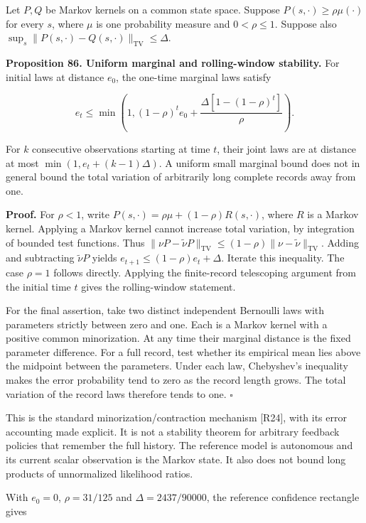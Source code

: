 Let \(P,Q\) be Markov kernels on a common state space. Suppose
\(P(s,\cdot)\geq\rho\mu(\cdot)\) for every \(s\), where \(\mu\) is one
probability measure and \(0<\rho\leq1\). Suppose also
\(\sup_s\|P(s,\cdot)-Q(s,\cdot)\|_{\mathrm{TV}}\leq\Delta\).

\textbf{Proposition 86. Uniform marginal and rolling-window stability.}
For initial laws at distance \(e_0\), the one-time marginal laws satisfy

\[
\boxed{
e_t\leq\min\left(1,
(1-\rho)^te_0+
\frac{\Delta[1-(1-\rho)^t]}{\rho}\right).
}
\]

For \(k\) consecutive observations starting at time \(t\), their joint
laws are at distance at most \(\min(1,e_t+(k-1)\Delta)\). A uniform
small marginal bound does not in general bound the total variation of
arbitrarily long complete records away from one.

\textbf{Proof.} For \(\rho<1\), write
\(P(s,\cdot)=\rho\mu+(1-\rho)R(s,\cdot)\), where \(R\) is a Markov
kernel. Applying a Markov kernel cannot increase total variation, by
integration of bounded test functions. Thus
\(\|\nu P-\widetilde\nu P\|_{\mathrm{TV}}\leq(1-\rho)\|\nu-\widetilde\nu\|_{\mathrm{TV}}\).
Adding and subtracting \(\widetilde\nu P\) yields
\(e_{t+1}\leq(1-\rho)e_t+\Delta\). Iterate this inequality. The case
\(\rho=1\) follows directly. Applying the finite-record telescoping
argument from the initial time \(t\) gives the rolling-window statement.

For the final assertion, take two distinct independent Bernoulli laws
with parameters strictly between zero and one. Each is a Markov kernel
with a positive common minorization. At any time their marginal distance
is the fixed parameter difference. For a full record, test whether its
empirical mean lies above the midpoint between the parameters. Under
each law, Chebyshev's inequality makes the error probability tend to
zero as the record length grows. The total variation of the record laws
therefore tends to one. \(\square\)

This is the standard minorization/contraction mechanism {[}R24{]}, with
its error accounting made explicit. It is not a stability theorem for
arbitrary feedback policies that remember the full history. The
reference model is autonomous and its current scalar observation is the
Markov state. It also does not bound long products of unnormalized
likelihood ratios.

With \(e_0=0\), \(\rho=31/125\) and \(\Delta=2437/90000\), the reference
confidence rectangle gives

